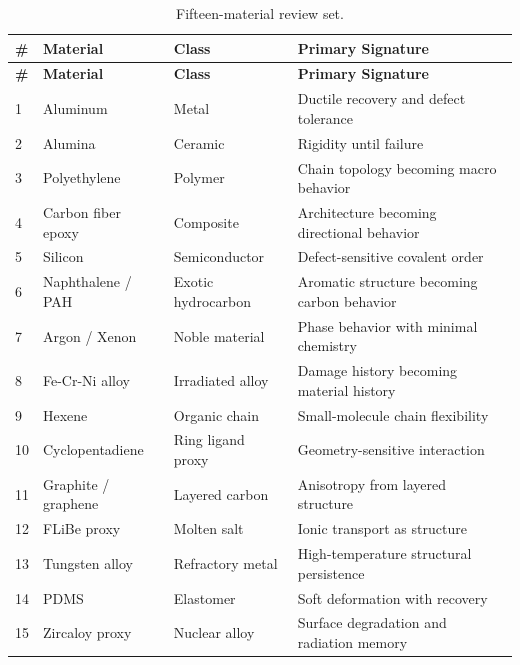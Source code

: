\documentclass[12pt]{article}
\begin{document}
\begin{longtable}{p{}p{}p{}p{}}
\caption{Fifteen-material review set.}
\label{tab:material_set}\\
\toprule
\textbf{\#} & \textbf{Material} & \textbf{Class} & \textbf{Primary Signature} \\
\midrule
\endfirsthead
\toprule
\textbf{\#} & \textbf{Material} & \textbf{Class} & \textbf{Primary Signature} \\
\midrule
\endhead
1  & Aluminum             & Metal                  & Ductile recovery and defect tolerance \\
2  & Alumina              & Ceramic                & Rigidity until failure \\
3  & Polyethylene         & Polymer                & Chain topology becoming macro behavior \\
4  & Carbon fiber epoxy   & Composite              & Architecture becoming directional behavior \\
5  & Silicon              & Semiconductor          & Defect-sensitive covalent order \\
6  & Naphthalene / PAH    & Exotic hydrocarbon     & Aromatic structure becoming carbon behavior \\
7  & Argon / Xenon        & Noble material         & Phase behavior with minimal chemistry \\
8  & Fe-Cr-Ni alloy       & Irradiated alloy       & Damage history becoming material history \\
9  & Hexene               & Organic chain          & Small-molecule chain flexibility \\
10 & Cyclopentadiene      & Ring ligand proxy      & Geometry-sensitive interaction \\
11 & Graphite / graphene  & Layered carbon         & Anisotropy from layered structure \\
12 & FLiBe proxy          & Molten salt            & Ionic transport as structure \\
13 & Tungsten alloy       & Refractory metal       & High-temperature structural persistence \\
14 & PDMS                 & Elastomer              & Soft deformation with recovery \\
15 & Zircaloy proxy       & Nuclear alloy          & Surface degradation and radiation memory \\
\bottomrule
\end{longtable}
\end{document}
